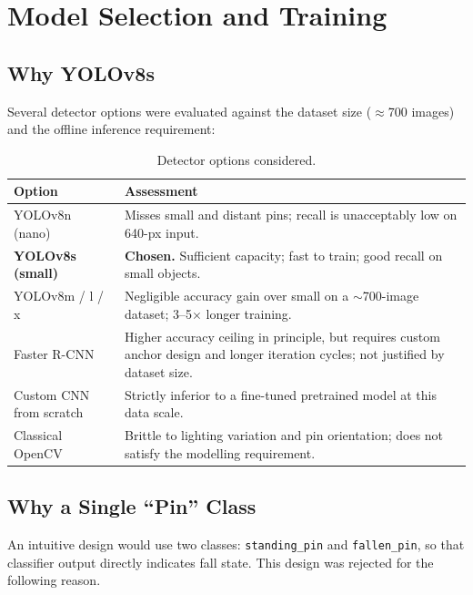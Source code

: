 \documentclass[11pt,a4paper]{article}
\begin{document}
\section{Model Selection and Training}

\subsection{Why YOLOv8s}
\label{sec:model-choice}

Several detector options were evaluated against the dataset size ($\approx$700 images) and the offline inference requirement:

\begin{table}[H]
\centering
\caption{Detector options considered.}
\label{tab:model-choice}
\begin{tabular}{lp{9cm}}
\toprule
Option & Assessment \\
\midrule
YOLOv8n (nano) & Misses small and distant pins; recall is unacceptably low on 640-px input. \\
\textbf{YOLOv8s (small)} & \textbf{Chosen.} Sufficient capacity; fast to train; good recall on small objects. \\
YOLOv8m / l / x & Negligible accuracy gain over small on a $\sim$700-image dataset; 3--5$\times$ longer training. \\
Faster R-CNN & Higher accuracy ceiling in principle, but requires custom anchor design and longer iteration cycles; not justified by dataset size. \\
Custom CNN from scratch & Strictly inferior to a fine-tuned pretrained model at this data scale. \\
Classical OpenCV & Brittle to lighting variation and pin orientation; does not satisfy the modelling requirement. \\
\bottomrule
\end{tabular}
\end{table}

\subsection{Why a Single ``Pin'' Class}
\label{sec:single-class}

An intuitive design would use two classes: \texttt{standing\_pin} and \texttt{fallen\_pin}, so that classifier output directly indicates fall state. This design was rejected for the following reason.
\end{document}
